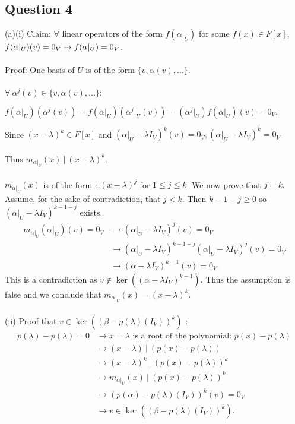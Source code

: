 \documentclass{article}
\begin{document}
\subsection*{Question 4}
(a)(i) 
Claim: $\forall$ linear operators of the form $f(\alpha|_U)$ for some $f(x) \in F[x]$, $\\ f(\alpha|_U)(v) = 0_V \to f(\alpha|_U) = 0_V$.\\\\
Proof: One basis of $U$ is of the form $\{v,\alpha(v),...\}.$\\\\
$\forall\ \alpha^j(v) \in \{v,\alpha(v),...\}:$
\begin{center} $f(\alpha|_U)(\alpha^j(v)) = f(\alpha|_U)(\alpha^j|_U(v)) = (\alpha^j|_U)f(\alpha|_U)(v) = 0_V.$ 
\end{center}
Since $(x - \lambda)^k \in F[x]$ and $(\alpha|_U - \lambda I_V)^k(v) = 0_V, (\alpha|_U - \lambda I_V)^k = 0_V$\\\\
Thus $m_{\alpha|_U}(x) \ | \ (x-\lambda)^k.$\\\\
$m_{\alpha|_U}(x)$ is of the form : $(x - \lambda)^j$ for $1 \leq j \leq k$. We now prove that $j = k.$ Assume, for the sake of contradiction, that $j < k.$ 
Then $k - 1 - j \geq 0$ so $(\alpha|_U - \lambda I_V)^{k-1-j}$ exists.\begin{align*}
m_{\alpha|_U}(\alpha|_U)(v) = 0_V &\to (\alpha|_U - \lambda I_V)^j(v) = 0_V\\ &\to (\alpha|_U-\lambda I_V)^{k-1-j}(\alpha|_U - \lambda I_V)^j(v) = 0_V\\ &\to (\alpha - \lambda I_V)^{k-1}(v) = 0_V.
\end{align*}
 This is a contradiction as $v \not \in \ker((\alpha - \lambda I_V)^{k-1})$. Thus the assumption is false and we conclude that $m_{\alpha|_U}(x) = (x-\lambda)^k.$\\\\
 (ii) Proof that $v \in \ker((\beta - p(\lambda)(I_V))^k)$ : \begin{align*}
 p(\lambda) - p(\lambda) = 0 &\to x = \lambda \text{ is a root of the polynomial: } p(x) - p(\lambda) \\ &\to (x - \lambda) \ | \ (p(x) - p(\lambda)) \\ &\to (x - \lambda)^k \ | \ (p(x) - p(\lambda))^k\\ &\to m_{\alpha|_U}(x) \ |\ (p(x) - p(\lambda))^k \\ &\to (p(\alpha) - p(\lambda)(I_V))^k(v) = 0_V \\ &\to v \in \ker((\beta - p(\lambda)(I_V))^k).
 \end{align*}
\end{document}

